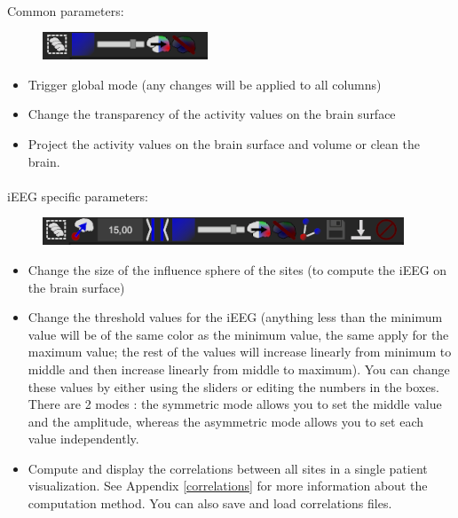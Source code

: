\documentclass[a4paper]{article}
\begin{document}
\paragraph{} Common parameters:
\begin{figure}[H]
\begin{center}
\includegraphics[scale=0.5]{ActivitySettings.png}
\end{center}
\end{figure}
\begin{itemize}
\item Trigger global mode (any changes will be applied to all columns)
\item Change the transparency of the activity values on the brain surface
\item Project the activity values on the brain surface and volume or clean the brain.
\end{itemize}
\paragraph{} iEEG specific parameters:
\begin{figure}[H]
\begin{center}
\includegraphics[scale=0.5]{iEEGSettings.png}
\end{center}
\end{figure}
\begin{itemize}
\item Change the size of the influence sphere of the sites (to compute the iEEG on the brain surface)
\item Change the threshold values for the iEEG (anything less than the minimum value will be of the same color as the minimum value, the same apply for the maximum value; the rest of the values will increase linearly from minimum to middle and then increase linearly from middle to maximum). You can change these values by either using the sliders or editing the numbers in the boxes. There are 2 modes : the symmetric mode allows you to set the middle value and the amplitude, whereas the asymmetric mode allows you to set each value independently.
\item Compute and display the correlations between all sites in a single patient visualization. See Appendix \ref{correlations} for more information about the computation method. You can also save and load correlations files.
\end{itemize}
\end{document}
